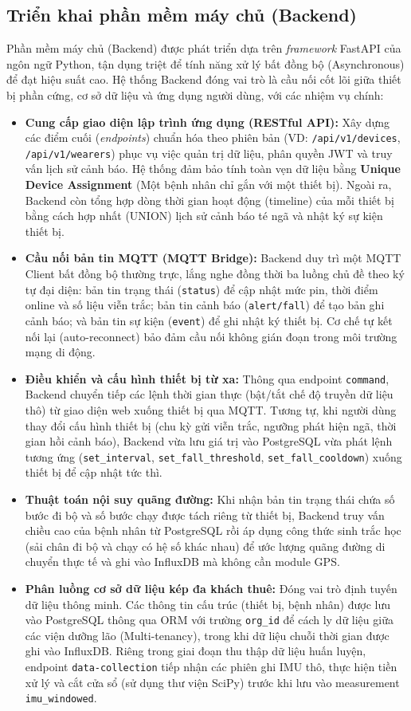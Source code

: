 \documentclass[../DoAn.tex]{subfiles}
\begin{document}
\subsection{Triển khai phần mềm máy chủ (Backend)}
Phần mềm máy chủ (Backend) được phát triển dựa trên \textit{framework} FastAPI của ngôn ngữ Python, tận dụng triệt để tính năng xử lý bất đồng bộ (Asynchronous) để đạt hiệu suất cao. Hệ thống Backend đóng vai trò là cầu nối cốt lõi giữa thiết bị phần cứng, cơ sở dữ liệu và ứng dụng người dùng, với các nhiệm vụ chính:
\begin{itemize}
    \item \textbf{Cung cấp giao diện lập trình ứng dụng (RESTful API):} Xây dựng các điểm cuối (\textit{endpoints}) chuẩn hóa theo phiên bản (VD: \texttt{/api/v1/devices}, \texttt{/api/v1/wearers}) phục vụ việc quản trị dữ liệu, phân quyền JWT và truy vấn lịch sử cảnh báo. Hệ thống đảm bảo tính toàn vẹn dữ liệu bằng \textbf{Unique Device Assignment} (Một bệnh nhân chỉ gắn với một thiết bị). Ngoài ra, Backend còn tổng hợp dòng thời gian hoạt động (timeline) của mỗi thiết bị bằng cách hợp nhất (UNION) lịch sử cảnh báo té ngã và nhật ký sự kiện thiết bị.
    \item \textbf{Cầu nối bản tin MQTT (MQTT Bridge):} Backend duy trì một MQTT Client bất đồng bộ thường trực, lắng nghe đồng thời ba luồng chủ đề theo ký tự đại diện: bản tin trạng thái (\texttt{status}) để cập nhật mức pin, thời điểm online và số liệu viễn trắc; bản tin cảnh báo (\texttt{alert/fall}) để tạo bản ghi cảnh báo; và bản tin sự kiện (\texttt{event}) để ghi nhật ký thiết bị. Cơ chế tự kết nối lại (auto-reconnect) bảo đảm cầu nối không gián đoạn trong môi trường mạng di động.
    \item \textbf{Điều khiển và cấu hình thiết bị từ xa:} Thông qua endpoint \texttt{command}, Backend chuyển tiếp các lệnh thời gian thực (bật/tắt chế độ truyền dữ liệu thô) từ giao diện web xuống thiết bị qua MQTT. Tương tự, khi người dùng thay đổi cấu hình thiết bị (chu kỳ gửi viễn trắc, ngưỡng phát hiện ngã, thời gian hồi cảnh báo), Backend vừa lưu giá trị vào PostgreSQL vừa phát lệnh tương ứng (\texttt{set\_interval}, \texttt{set\_fall\_threshold}, \texttt{set\_fall\_cooldown}) xuống thiết bị để cập nhật tức thì.
    \item \textbf{Thuật toán nội suy quãng đường:} Khi nhận bản tin trạng thái chứa số bước đi bộ và số bước chạy được tách riêng từ thiết bị, Backend truy vấn chiều cao của bệnh nhân từ PostgreSQL rồi áp dụng công thức sinh trắc học (sải chân đi bộ và chạy có hệ số khác nhau) để ước lượng quãng đường di chuyển thực tế và ghi vào InfluxDB mà không cần module GPS.
    \item \textbf{Phân luồng cơ sở dữ liệu kép đa khách thuê:} Đóng vai trò định tuyến dữ liệu thông minh. Các thông tin cấu trúc (thiết bị, bệnh nhân) được lưu vào PostgreSQL thông qua ORM với trường \texttt{org\_id} để cách ly dữ liệu giữa các viện dưỡng lão (Multi-tenancy), trong khi dữ liệu chuỗi thời gian được ghi vào InfluxDB. Riêng trong giai đoạn thu thập dữ liệu huấn luyện, endpoint \texttt{data-collection} tiếp nhận các phiên ghi IMU thô, thực hiện tiền xử lý và cắt cửa sổ (sử dụng thư viện SciPy) trước khi lưu vào measurement \texttt{imu\_windowed}.
\end{itemize}
\end{document}
